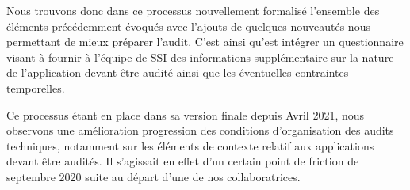 Nous trouvons donc dans ce processus nouvellement formalisé l'ensemble des éléments précédemment évoqués avec l'ajouts 
de quelques nouveautés nous permettant de mieux préparer l'audit. C'est ainsi qu'est intégrer un questionnaire visant à
fournir à l'équipe de \ac{SSI} des informations supplémentaire sur la nature de l'application devant être audité ainsi 
que les éventuelles contraintes temporelles.

Ce processus étant en place dans sa version finale depuis Avril 2021, nous observons une amélioration progression des 
conditions d'organisation des audits techniques, notamment sur les éléments de contexte relatif aux applications devant 
être audités.
Il s'agissait en effet d'un certain point de friction de septembre 2020 suite au départ d'une de nos collaboratrices.

\newpage

